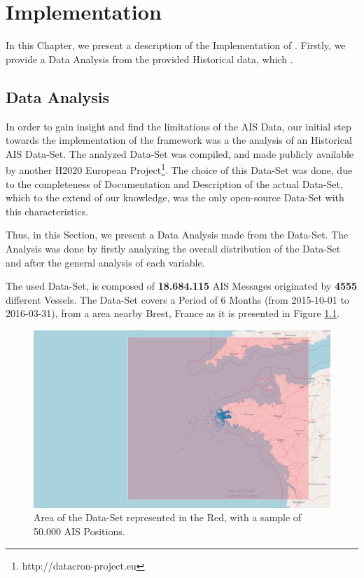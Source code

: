 \chapter{Implementation}
\label{chapter:Chapter 4}

In this Chapter, we present a description of the Implementation of . Firstly, we provide a Data Analysis from the provided Historical data, which .

\section{Data Analysis}
\label{section: Data Analysis}
In order to gain insight and find the limitations of the AIS Data, our initial step towards the implementation of the framework was a the analysis of an Historical AIS Data-Set. The analyzed Data-Set was compiled, and made publicly available by another H2020 European Project\footnote{http://datacron-project.eu}.  The choice of this Data-Set was done, due to the completeness of Documentation and Description of the actual Data-Set, which to the extend of our knowledge, was the only open-source Data-Set with this characteristics.  

Thus, in this Section, we present a Data Analysis made from the Data-Set\cite{DATASET}. The Analysis was done by firstly analyzing the overall distribution of the Data-Set and after the general analysis of each variable.  

The used Data-Set, is composed of \textbf{18.684.115} AIS Messages originated by \textbf{4555} different Vessels. The Data-Set covers a Period of 6 Months (from 2015-10-01 to 2016-03-31), from a area nearby Brest, France as it is presented in Figure \ref{fig:DS_Sample}.

\begin{figure}[H]
	\centering
	\includegraphics[scale = .23]{figures/Ch4/nari_DS_ex2.png}
    \caption{Area of the Data-Set represented in the Red, with a sample of 50.000 AIS Positions.}
    \label{fig:DS_Sample}
\end{figure}


